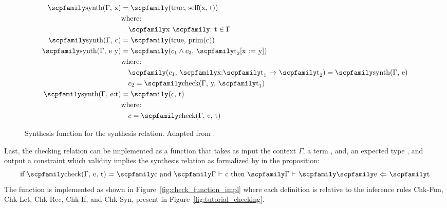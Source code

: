 \documentclass[
  oneside,
  english,
  coorientadorbanca,
  noabntexcite
]{ufsc-thesis-rn46-2019}
\newcommand{\codett}[1]{\text{\scpfamily#1}}
\newcommand{\code}[1]{\text{\scpfamily\setlength\spaceskip{0.35em}#1}}
\newcommand{\typer}[2]{\code{#1 \codett{:} #2}}
\newcommand{\ctxtr}[2]{\code{{$\Gamma$}#1 {$\vdash$} #2}}
\newcommand{\checkr}[2]{\code{#1 $\Leftarrow$ #2}}
\newcommand{\checkcxr}[3]{\ctxtr{#1}{\checkr{#2}{#3}}}
\newcommand{\fnty}[2]{\code{#1 $\rightarrow$ #2}}
\begin{document}
\begin{figure}[ht]
  \begin{align*}
    \code{synth($\Gamma$, x)}
     & = \code{(true, self(x, t))}                                                           \\
     & \textrm{where:}                                                                       \\
     & \quad \typer{x}{t} \in \Gamma                                                         \\
    \code{synth($\Gamma$, c)}
     & = \code{(true, prim(c))}                                                              \\
    \code{synth($\Gamma$, e y)}
     & = \code{($c_1 \land c_2$, $\code{t}_2$[x := y])}                                      \\
     & \textrm{where:}                                                                       \\
     & \quad \code{($c_1$, \fnty{x:$\code{t}_1$}{$\code{t}_2$})} = \code{synth($\Gamma$, e)} \\
     & \quad c_2 = \code{check($\Gamma$, y, $\code{t}_1$)}                                   \\
    \code{synth($\Gamma$, e:t)}
     & = \code{($c$, t)}                                                                     \\
     & \textrm{where:}                                                                       \\
     & \quad c = \code{check($\Gamma$, e, t)}
  \end{align*}
  \caption{
    Synthesis function for the synthesis relation.
    Adapted from \textcite{jhala2020tutorial}.
  }\label{fig:synth_function_impl}
\end{figure}

Last, the checking relation can be implemented as a function \code{check} that takes as input the context $\Gamma$, a term \code{e}, and, an expected type \code{t}, and output a constraint \code{c} which validity implies the synthesis relation as formalized by \textcite{jhala2020tutorial} in the proposition:
\begin{equation*}
  \textrm{if \code{check($\Gamma$, e, t)} = \code{c} and \ctxtr{}{c} then \checkcxr{}{\code{e}}{\code{t}}}
\end{equation*}
The function \code{check} is implemented as shown in Figure~\ref{fig:check_function_impl} where each definition is relative to the inference rules Chk-Fun, Chk-Let, Chk-Rec, Chk-If, and Chk-Syn, present in Figure~\ref{fig:tutorial_checking}.
\end{document}
